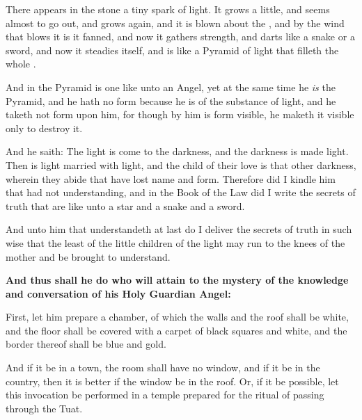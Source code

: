 \index{\AEthyr{}|(}


There appears in the stone a tiny spark of light. It grows a little, and seems almost to go out, and grows again, and it is blown about the \AEthyr, and by the wind that blows it is it fanned, and now it gathers strength, and darts like a snake or a sword, and now it steadies itself, and is like a Pyramid of light that filleth the whole \AEthyr.

And in the Pyramid is one like unto an Angel, yet at the same time he \textit{is} the Pyramid, and he hath no form because he is of the substance of light, and he taketh not form upon him, for though by him is form visible, he maketh it visible only to destroy it.

And he saith: The light is come to the darkness, and the darkness is made light. Then is light married with light, and the child of their love is that other darkness, wherein they abide that have lost name and form. Therefore did I kindle him that had not understanding, and in the Book of the Law did I write the secrets of truth that are like unto a star and a snake and a sword.

And unto him that understandeth at last do I deliver the secrets of truth in such wise that the least of the little children of the light may run to the knees of the mother and be brought to understand.


\textbf{And thus shall he do who will attain to the mystery of the knowledge and conversation of his Holy Guardian Angel:}


First, let him prepare a chamber, of which the walls and the roof shall be white, and the floor shall be covered with a carpet of black squares and white, and the border thereof shall be blue and gold.

And if it be in a town, the room shall have no window, and if it be in the country, then it is better if the window be in the roof. Or, if it be possible, let this invocation be performed in a temple prepared for the ritual of passing through the Tuat.

